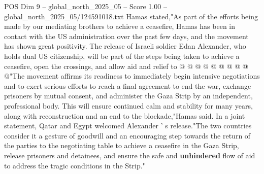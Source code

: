 \begin{textsample}{POS Dim 9 – global\_north\_2025\_05 – Score 1.00 – global\_north\_2025\_05/124591018.txt}
Hamas stated,"As part of the efforts being made by our mediating brothers to achieve a ceasefire, Hamas has been in contact with the US administration over the past few days, and the movement has shown great positivity.
The release of Israeli soldier Edan Alexander, who holds dual US citizenship, will be part of the steps being taken to achieve a ceasefire, open the crossings, and allow aid and relief to @ @ @ @ @ @ @ @ @ @"The movement affirms its readiness to immediately begin intensive negotiations and to exert serious efforts to reach a final agreement to end the war, exchange prisoners by mutual consent, and administer the Gaza Strip by an independent, professional body.
This will ensure continued calm and stability for many years, along with reconstruction and an end to the blockade,"Hamas said.
In a joint statement, Qatar and Egypt welcomed Alexander ' s release."The two countries consider it a gesture of goodwill and an encouraging step towards the return of the parties to the negotiating table to achieve a ceasefire in the Gaza Strip, release prisoners and detainees, and ensure the safe and \textbf{unhindered} flow of aid to address the tragic conditions in the Strip."

\end{textsample}
